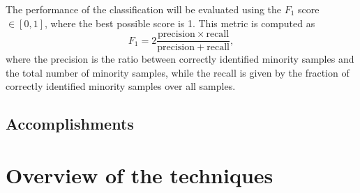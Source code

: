 \documentclass[conference]{IEEEtran}
\begin{document}
		The performance of the classification will be evaluated using the $F_1$ score $\in [0, 1]$, where the best possible score is 1. This metric is computed as
			\begin{equation*}
				F_1 = 2\frac{\mathrm{precision}\times\mathrm{recall}}{\mathrm{precision}+\mathrm{recall}},
			\end{equation*}
where the precision is the ratio between correctly identified minority samples and the total number of minority samples, while the recall is given by the fraction of correctly identified minority samples over all samples.

	\subsection{Accomplishments}


\section{Overview of the techniques}
\end{document}
